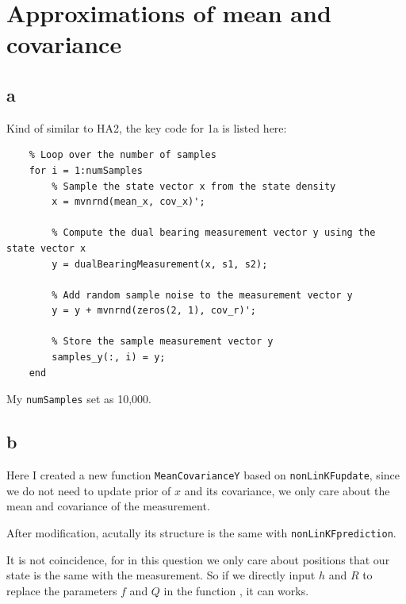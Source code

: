 \section{Approximations of mean and covariance}

\subsection{a}

Kind of similar to HA2, the key code for 1a is listed here:

\begin{lstlisting}
    % Loop over the number of samples
    for i = 1:numSamples
        % Sample the state vector x from the state density
        x = mvnrnd(mean_x, cov_x)';
        
        % Compute the dual bearing measurement vector y using the state vector x
        y = dualBearingMeasurement(x, s1, s2);
        
        % Add random sample noise to the measurement vector y
        y = y + mvnrnd(zeros(2, 1), cov_r)';
        
        % Store the sample measurement vector y
        samples_y(:, i) = y;
    end

\end{lstlisting}

My \texttt{numSamples} set as 10,000.

\subsection{b}

Here I created a new function \texttt{MeanCovarianceY} based on \texttt{nonLinKFupdate}, since we do not need to update prior of $x$ and its covariance, we only care about the mean and covariance of the measurement.

After modification, acutally its structure is the same with \texttt{nonLinKFprediction}. 

It is not coincidence, for in this question we only care about positions that our state is the same with the measurement. So if we directly input $ h $ and $ R $ to replace the parameters $ f $ and $ Q $ in the function , it can works.

